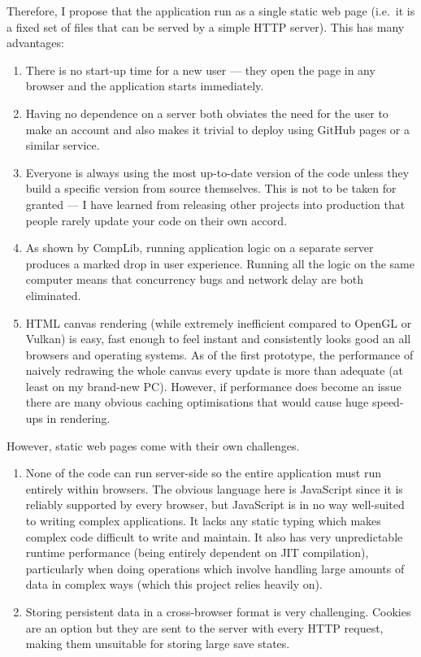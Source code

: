 \documentclass[12pt]{article}
\newcommand{\br}[0]{\vspace{10pt} \noindent}
\begin{document}
Therefore, I propose that the application run as a single static web page (i.e.\ it is a fixed set
of files that can be served by a simple HTTP server).  This has many advantages:
\begin{enumerate}
    \item There is no start-up time for a new user --- they open the page in any browser and the
        application starts immediately.
    \item Having no dependence on a server both obviates the need for the user to make an account
        and also makes it trivial to deploy using GitHub pages or a similar service.
    \item Everyone is always using the most up-to-date version of the code unless they build a
        specific version from source themselves.  This is not to be taken for granted --- I have
        learned from releasing other projects into production that people rarely update your code on
        their own accord.
    \item As shown by CompLib, running application logic on a separate server produces a marked drop
        in user experience.  Running all the logic on the same computer means that concurrency bugs
        and network delay are both eliminated.
    \item HTML canvas rendering (while extremely inefficient compared to OpenGL or Vulkan) is easy,
        fast enough to feel instant and consistently looks good an all browsers and operating
        systems.  As of the first prototype, the performance of naively redrawing the whole canvas
        every update is more than adequate (at least on my brand-new PC).  However, if performance
        does become an issue there are many obvious caching optimisations that would cause huge
        speed-ups in rendering.
\end{enumerate}

\br{}However, static web pages come with their own challenges.

\begin{enumerate}
    \item None of the code can run server-side so the entire application must run entirely within
        browsers.  The obvious language here is JavaScript since it is reliably supported by every
        browser, but JavaScript is in no way well-suited to writing complex applications.  It lacks
        any static typing which makes complex code difficult to write and maintain.  It also has
        very unpredictable runtime performance (being entirely dependent on JIT compilation),
        particularly when doing operations which involve handling large amounts of data in complex
        ways (which this project relies heavily on).
    \item Storing persistent data in a cross-browser format is very challenging.  Cookies are an
        option but they are sent to the server with every HTTP request, making them unsuitable for
        storing large save states.
\end{enumerate}
\end{document}
